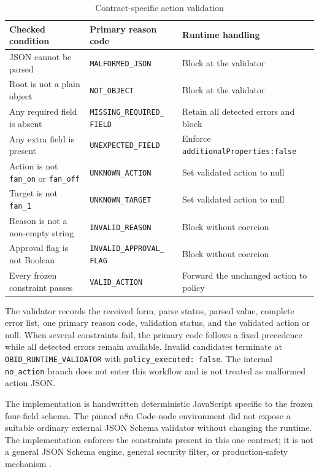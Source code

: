 \begin{table}[H]
\centering
\caption{Contract-specific action validation}
\label{tab:impl-validation}
\small
\begin{tabularx}{\textwidth}{L{0.31\textwidth}L{0.28\textwidth}Y}
\toprule
\textbf{Checked condition} & \textbf{Primary reason code} &
\textbf{Runtime handling} \\
\midrule
JSON cannot be parsed & \texttt{MALFORMED\_JSON} & Block at the validator \\
Root is not a plain object & \texttt{NOT\_OBJECT} & Block at the validator \\
Any required field is absent & \texttt{MISSING\_REQUIRED\_}\newline
\texttt{FIELD} & Retain all
detected errors and block \\
Any extra field is present & \texttt{UNEXPECTED\_FIELD} & Enforce
{\footnotesize\texttt{additionalProperties:}}\newline\texttt{false} \\
Action is not \texttt{fan\_on} or \texttt{fan\_off} &
\texttt{UNKNOWN\_ACTION} & Set validated action to null \\
Target is not \texttt{fan\_1} & \texttt{UNKNOWN\_TARGET} & Set validated
action to null \\
Reason is not a non-empty string & \texttt{INVALID\_REASON} & Block without
coercion \\
Approval flag is not Boolean & \texttt{INVALID\_APPROVAL\_}\newline
\texttt{FLAG} & Block
without coercion \\
Every frozen constraint passes & \texttt{VALID\_ACTION} & Forward the
unchanged action to policy \\
\bottomrule
\end{tabularx}
\end{table}

The validator records the received form, parse status, parsed value, complete
error list, one primary reason code, validation status, and the validated
action or null. When several constraints fail, the primary code follows a
fixed precedence while all detected errors remain available. Invalid
candidates terminate at \texttt{OBID\_RUNTIME\_VALIDATOR} with
\texttt{policy\_executed: false}. The internal \texttt{no\_action} branch does
not enter this workflow and is not treated as malformed action JSON.

The implementation is handwritten deterministic JavaScript specific to the
frozen four-field schema. The pinned n8n Code-node environment did not expose
a suitable ordinary external JSON Schema validator without changing the
runtime. The implementation enforces the constraints present in this one
contract; it is not a general JSON Schema engine, general security filter, or
production-safety mechanism
\cite{wright2022jsonschemavalidation,schneider2000enforceable}.

